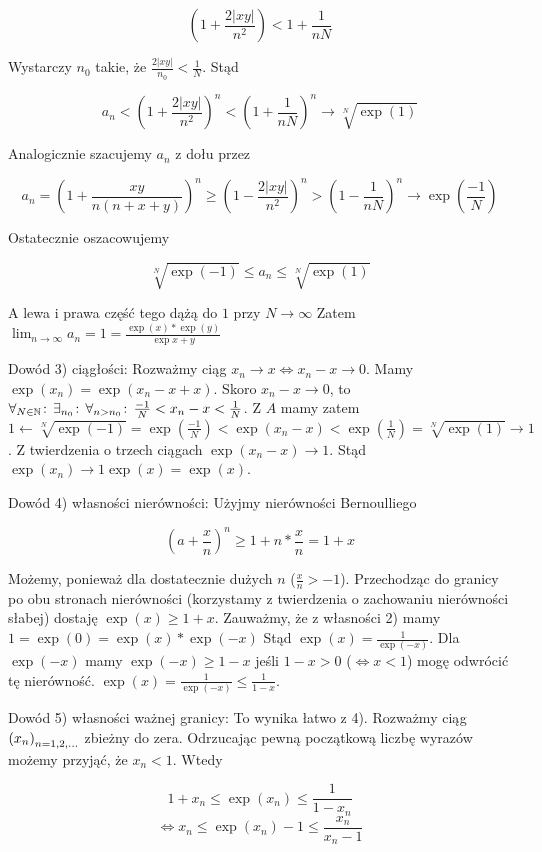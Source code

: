 \documentclass[9pt]{article}
\begin{document}
\[
    \left(1 + \frac{2|xy|}{n^2}\right) < 1 + \frac{1}{nN}
\]

Wystarczy $n_0$ takie, że $\frac{2|xy|}{n_0} < \frac{1}{N}$. Stąd

\[
    a_n < \left(1 + \frac{2|xy|}{n^2}\right)^n < \left(1 + \frac{1}{nN}\right)^n \to
    \sqrt[N]{\exp(1)}
\]

Analogicznie szacujemy $a_n$ z dołu przez

\[
    a_n = \left(1 + \frac{xy}{n(n+x+y)}\right)^n \ge \left(1 - \frac{2|xy|}{n^2}\right)^n > \left(1
        - \frac{1}{nN}\right)^n \to \exp\left(\frac{-1}{N}\right)
\]

Ostatecznie oszacowujemy

\[
    \sqrt[N]{\exp(-1)} \le a_n \le \sqrt[N]{\exp(1)}   
\]

A lewa i prawa część tego dążą do $1$ przy $N \to \infty$
Zatem $\lim_{n \to \infty}a_n = 1 = \frac{\exp(x)*\exp(y)}{\exp{x+y}}$

\bigbreak

Dowód 3) ciągłości: Rozważmy ciąg $x_n \to x \iff x_n - x \to 0$. Mamy $\exp(x_n) = \exp(x_n - x +
x)$. Skoro $x_n - x \to 0$, to $\forall_{N \in \mathbb{N}} \! : \,\exists_{n_0} \! : \, \forall_{n > n_0} \! : \, \frac{-1}{N} < x_n - x <
\frac{1}{N}$. Z $A$ mamy zatem $1 \leftarrow \sqrt[N]{\exp(-1)} = \exp\left(\frac{-1}{N}\right) <
\exp(x_n - x) < \exp\left(\frac{1}{N}\right) =\sqrt[N]{\exp(1)} \to 1$. Z twierdzenia o trzech
ciągach $\exp(x_n - x) \to 1$. Stąd $\exp(x_n) \to 1\exp(x) = \exp(x)$.

\bigbreak

Dowód 4) własności nierówności: Użyjmy nierówności Bernoulliego

\[
    \left(a+\frac{x}{n}\right)^n \ge 1+n*\frac{x}{n} = 1+x
\]

Możemy, ponieważ dla dostatecznie dużych $n$ ($\frac{x}{n} > -1$). Przechodząc do granicy po obu
stronach nierówności (korzystamy z twierdzenia o zachowaniu nierówności słabej) dostaję $\exp(x) \ge
1+x$. Zauważmy, że z własności 2) mamy $1 = \exp(0) = \exp(x)*\exp(-x)$ Stąd $\exp(x) =
\frac{1}{\exp(-x)}$. Dla $\exp(-x)$ mamy $\exp(-x) \ge 1-x$ jeśli $1-x > 0$ ($\iff x < 1$) mogę
odwrócić tę nierówność. $\exp(x) = \frac{1}{\exp(-x)} \le \frac{1}{1-x}$.

\bigbreak

Dowód 5) własności ważnej granicy: To wynika łatwo z 4). Rozważmy ciąg $\left(x_n\right)_{n = 1,2,...}$ zbieżny do zera.
Odrzucając pewną początkową liczbę wyrazów możemy przyjąć, że $x_n < 1$. Wtedy

\[
    1 + x_n \le \exp(x_n) \le \frac{1}{1-x_n}
\]
\[
    \iff x_n \le \exp(x_n)-1 \le \frac{x_n}{x_n-1}
\]
\end{document}
